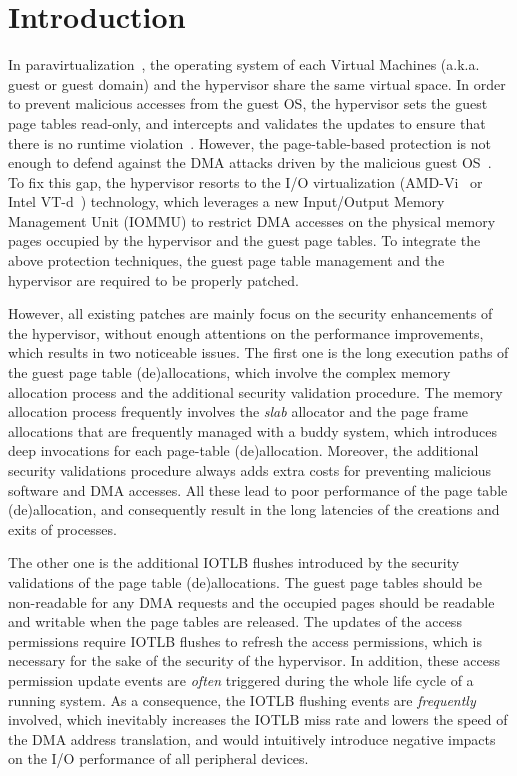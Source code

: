 \section{Introduction} \label{sec:intro}
In paravirtualization~\cite{XEN-SOSP03,whitaker2002scale}, the operating system of each Virtual Machines (a.k.a. guest or guest domain) and the hypervisor share the same virtual space.
In order to prevent malicious accesses from the guest OS, the hypervisor sets the guest page tables read-only, and intercepts and validates the updates to ensure that there is no runtime violation~\cite{XEN-SOSP03}.
However, the page-table-based protection is not enough to defend against the DMA attacks driven by the malicious guest OS~\cite{disaggregation}.
To fix this gap, the hypervisor resorts to the I/O virtualization (AMD-Vi~\cite{amdvt} or Intel VT-d~\cite{intelvt}) technology, which leverages a new Input/Output Memory Management Unit (IOMMU) to restrict DMA accesses on the physical memory pages occupied by the hypervisor and the guest page tables.
To integrate the above protection techniques, the guest page table management and the hypervisor are required to be properly patched.

However, all existing patches are mainly focus on the security enhancements of the hypervisor, without enough attentions on the performance improvements, which results in two noticeable issues.
The first one is the long execution paths of the guest page table (de)allocations, which involve the complex memory allocation process and the additional security validation procedure. 
The memory allocation process frequently involves the \emph{slab} allocator and the page frame allocations that are frequently managed with a buddy system, which introduces deep invocations for each page-table (de)allocation.
Moreover, the additional security validations procedure always adds extra costs for preventing malicious software and DMA accesses.  
All these lead to poor performance of the page table (de)allocation, and consequently result in the long latencies of the creations and exits of processes. 

The other one is the additional IOTLB flushes introduced by the security validations of the page table (de)allocations. 
The guest page tables should be non-readable for any DMA requests and the occupied pages should be readable and writable when the page tables are released. 
The updates of the access permissions require IOTLB flushes to refresh the access permissions, which is necessary for the sake of the security of the hypervisor.
In addition, these access permission update events are \emph{often} triggered during the whole life cycle of a running system.
As a consequence, the IOTLB flushing events are \emph{frequently} involved, which inevitably increases the IOTLB miss rate and lowers the speed of the DMA address translation, and would intuitively introduce negative impacts on the I/O performance of all peripheral devices. 


